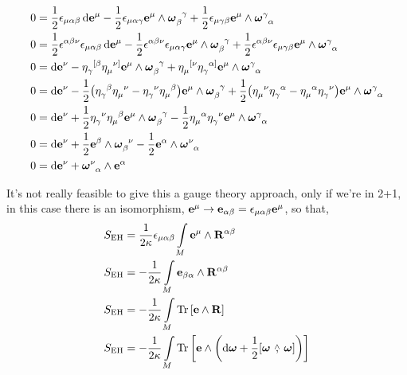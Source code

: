 \begin{align*}
    0&=\frac{1}{2}\epsilon_{\mu\alpha\beta}\dd{\vb e^\mu}-\frac{1}{2}\epsilon_{\mu\alpha\gamma}\vb e^\mu\wedge\tensor{\boldsymbol\omega}{_\beta^\gamma}+\frac{1}{2}\epsilon_{\mu\gamma\beta}\vb e^\mu\wedge\tensor{\boldsymbol\omega}{^\gamma_\alpha}\\
    0&=\frac{1}{2}\epsilon^{\alpha\beta\nu}\epsilon_{\mu\alpha\beta}\dd{\vb e^\mu}-\frac{1}{2}\epsilon^{\alpha\beta\nu}\epsilon_{\mu\alpha\gamma}\vb e^\mu\wedge\tensor{\boldsymbol\omega}{_\beta^\gamma}+\frac{1}{2}\epsilon^{\alpha\beta\nu}\epsilon_{\mu\gamma\beta}\vb e^\mu\wedge\tensor{\boldsymbol\omega}{^\gamma_\alpha}\\
    0&=\dd{\vb e^\nu}-\tensor{\eta}{_\gamma^{[\beta}}\tensor{\eta}{_\mu^{\nu]}}\vb e^\mu\wedge\tensor{\boldsymbol\omega}{_\beta^\gamma}+\tensor{\eta}{_\mu^{[\nu}}\tensor{\eta}{_\gamma^{\alpha]}}\vb e^\mu\wedge\tensor{\boldsymbol\omega}{^\gamma_\alpha}\\
    0&=\dd{\vb e^\nu}-\frac{1}{2}\qty(\tensor{\eta}{_\gamma^{\beta}}\tensor{\eta}{_\mu^{\nu}}-\tensor{\eta}{_\gamma^{\nu}}\tensor{\eta}{_\mu^{\beta}})\vb e^\mu\wedge\tensor{\boldsymbol\omega}{_\beta^\gamma}+\frac{1}{2}\qty(\tensor{\eta}{_\mu^{\nu}}\tensor{\eta}{_\gamma^{\alpha}}-\tensor{\eta}{_\mu^{\alpha}}\tensor{\eta}{_\gamma^{\nu}})\vb e^\mu\wedge\tensor{\boldsymbol\omega}{^\gamma_\alpha}\\
    0&=\dd{\vb e^\nu}+\frac{1}{2}\tensor{\eta}{_\gamma^{\nu}}\tensor{\eta}{_\mu^{\beta}}\vb e^\mu\wedge\tensor{\boldsymbol\omega}{_\beta^\gamma}-\frac{1}{2}\tensor{\eta}{_\mu^{\alpha}}\tensor{\eta}{_\gamma^{\nu}}\vb e^\mu\wedge\tensor{\boldsymbol\omega}{^\gamma_\alpha}\\
    0&=\dd{\vb e^\nu}+\frac{1}{2}\vb e^\beta\wedge\tensor{\boldsymbol\omega}{_\beta^\nu}-\frac{1}{2}\vb e^\alpha\wedge\tensor{\boldsymbol\omega}{^\nu_\alpha}\\
    0&=\dd{\vb e^\nu}+\tensor{\boldsymbol\omega}{^\nu_\alpha}\wedge\vb e^\alpha
\end{align*}

It's not really feasible to give this a gauge theory approach, only if we're in 2+1, in this case there is an isomorphism, $\vb e^\mu\rightarrow \vb e_{\alpha\beta}=\epsilon_{\mu\alpha\beta}\vb e^\mu$, so that,
\begin{align*}
    S_{\textnormal{EH}}&=\frac{1}{2\kappa}\epsilon_{\mu\alpha\beta}\int\limits_M\vb e^\mu\wedge \vb R^{\alpha\beta}\\
    S_{\textnormal{EH}}&=-\frac{1}{2\kappa}\int\limits_M\vb e_{\beta\alpha}\wedge \vb R^{\alpha\beta}\\
    S_{\textnormal{EH}}&=-\frac{1}{2\kappa}\int\limits_M\Tr\qty[\vb e\wedge \vb R]\\
    S_{\textnormal{EH}}&=-\frac{1}{2\kappa}\int\limits_M\Tr\qty[\vb e\wedge\qty(\dd{\boldsymbol\omega}+\frac12\wedgecomm{\boldsymbol\omega}{\boldsymbol\omega})]
\end{align*}

